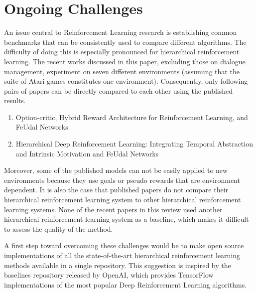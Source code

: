 \section{Ongoing Challenges}
An issue central to Reinforcement Learning research is establishing common benchmarks
that can be consistently used to compare different algorithms. The difficulty of
doing this is especially pronounced for hierarchical reinforcement learning.
The recent works discussed in this paper, excluding those on dialogue management,
experiment on seven different environments (assuming that the suite of Atari games
constitutes one environment). Consequently, only following pairs of papers
can be directly compared to each other using the published results.

\begin{enumerate}
    \item Option-critic, Hybrid Reward Architecture for Reinforcement Learning, and
          FeUdal Networks
    \item Hierarchical Deep Reinforcement Learning: Integrating Temporal Abstraction
          and Intrinsic Motivation and FeUdal Networks
\end{enumerate}

Moreover, some of the published models can not be easily applied to new environments because
they use goals or pseudo rewards that are environment dependent. It is also the case
that published papers do not compare their hierarchical reinforcement learning system to
other hierarchical reinforcement learning systems. None of the recent papers in this review
used another hierarchical reinforcement learning system as a baseline, which makes it difficult
to assess the quality of the method.

A first step toward overcoming these challenges would be to make open source implementations
of all the state-of-the-art hierarchical reinforcement learning methods available in a single repository.
This suggestion is inspired by the baselines repository released by OpenAI, which provides TensorFlow
implementations of the most popular Deep Reinforcement Learning algorithms.


